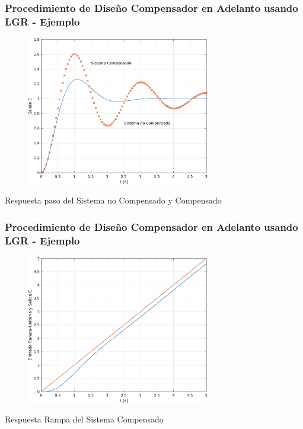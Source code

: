 \documentclass[aspectratio=169,handout]{beamer}
\theoremstyle{definition}
\theoremstyle{plain}
\theoremstyle{remark}
\begin{document}
\begin{frame}[c]\frametitle{Procedimiento de Diseño Compensador en Adelanto usando LGR - Ejemplo}
	\begin{figure}
		\includegraphics[width=8cm]{images/ejemplo1_comparacion.eps}
	\end{figure}
	\vspace*{-4mm}
	\centering \small Respuesta paso del Sistema no Compensado y Compensado
\end{frame}

\begin{frame}[c]\frametitle{Procedimiento de Diseño Compensador en Adelanto usando LGR - Ejemplo}
	\begin{figure}
		\includegraphics[width=8cm]{images/ejemplo1_comparacion_rampa.eps}
	\end{figure}
	\vspace*{-4mm}
	\centering \small Respuesta Rampa del Sistema Compensado
\end{frame}
\end{document}
